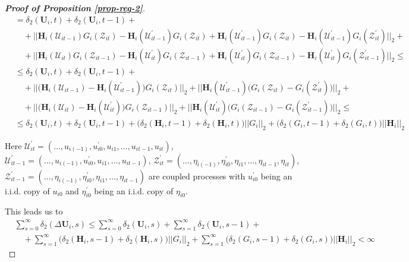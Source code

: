 \documentclass[a4paper,12pt]{article}
\begin{document}
\begin{proof}[\textnormal{\textbf{Proof of Proposition \ref{prop-reg-2}}}]
\begin{align*}
 & = \delta_2(\mathbf{U}_i, t) + \delta_2(\mathbf{U}_i, t-1)  +\\
 &\quad + ||\mathbf{H}_i(\mathcal{U}_{it-1})G_i(\mathcal{Z}_{it}) - \mathbf{H}_i(\mathcal{U}_{it-1}^\prime)G_i(\mathcal{Z}_{it}) + \mathbf{H}_i(\mathcal{U}_{it-1}^\prime)G_i(\mathcal{Z}_{it}) - \mathbf{H}_i(\mathcal{U}_{it-1}^\prime)G_i(\mathcal{Z}_{it}^\prime)    ||_2+\\
 &\quad + ||\mathbf{H}_i(\mathcal{U}_{it})G_i(\mathcal{Z}_{it-1}) -\mathbf{H}_i(\mathcal{U}_{it}^\prime)G_i(\mathcal{Z}_{it-1})+ \mathbf{H}_i(\mathcal{U}_{it}^\prime)G_i(\mathcal{Z}_{it-1})-  \mathbf{H}_i(\mathcal{U}_{it}^\prime)G_i(\mathcal{Z}_{it-1}^\prime) ||_2 \leq\\
  &\leq \delta_2(\mathbf{U}_i, t) + \delta_2(\mathbf{U}_i, t-1)  + \\
  &\quad +||\big(\mathbf{H}_i(\mathcal{U}_{it-1}) - \mathbf{H}_i(\mathcal{U}_{it-1}^\prime)\big) G_i(\mathcal{Z}_{it})||_2 +  ||\mathbf{H}_i(\mathcal{U}_{it-1}^\prime)\big(G_i(\mathcal{Z}_{it}) - G_i(\mathcal{Z}_{it}^\prime)\big)    ||_2+\\
 &\quad + ||\big(\mathbf{H}_i(\mathcal{U}_{it}) -\mathbf{H}_i(\mathcal{U}_{it}^\prime)\big)G_i(\mathcal{Z}_{it-1})||_2 + ||\mathbf{H}_i(\mathcal{U}_{it}^\prime)\big(G_i(\mathcal{Z}_{it-1}) -G_i(\mathcal{Z}_{it-1}^\prime)\big) ||_2 \leq \\
 &\leq \delta_2(\mathbf{U}_i, t) + \delta_2(\mathbf{U}_i, t-1)  + \big(\delta_2(\mathbf{H}_i, t-1) +  \delta_2(\mathbf{H}_i, t)\big) ||G_i ||_2+ \big( \delta_2(G_i, t-1) +  \delta_2(G_i, t)\big)||\mathbf{H}_i ||_2  
\end{align*}

Here $\mathcal{U}_{it}^\prime  = (\ldots, u_{i(-1)}, u^\prime_{i0}, u_{i1}, \ldots, u_{it-1}, u_{it})$, $\mathcal{U}_{it-1}^\prime  = (\ldots, u_{i(-1)}, u^\prime_{i0}, u_{i1}, \ldots, u_{it-1})$, $\mathcal{Z}_{it}^\prime  = (\ldots, \eta_{i(-1)}, \eta^\prime_{i0}, \eta_{i1}, \ldots, \eta_{it-1}, \eta_{it})$, $\mathcal{Z}_{it-1}^\prime  = (\ldots, \eta_{i(-1)}, \eta^\prime_{i0}, \eta_{i1}, \ldots, \eta_{it-1})$ are coupled processes with $u_{i0}^\prime$ being an i.i.d. copy of $u_{i0}$ and $\eta_{i0}^\prime$ being an i.i.d. copy of $\eta_{i0}$.

This leads us to 
\begin{align*}
 &\sum_{s=0}^\infty \delta_2(\Delta \mathbf{U}_i, s) \leq \sum_{s=0}^\infty \delta_2(\mathbf{U}_i, s) + \sum_{s=1}^\infty\delta_2(\mathbf{U}_i, s-1)  +\\
 &\quad + \sum_{s=1}^\infty\big(\delta_2(\mathbf{H}_i, s-1) +  \delta_2(\mathbf{H}_i, s)\big) ||G_i ||_2 + \sum_{s=1}^\infty\big( \delta_2(G_i, s-1) +  \delta_2(G_i, s)\big)||\mathbf{H}_i ||_2 <\infty 
\end{align*}


\end{proof}
\end{document}
